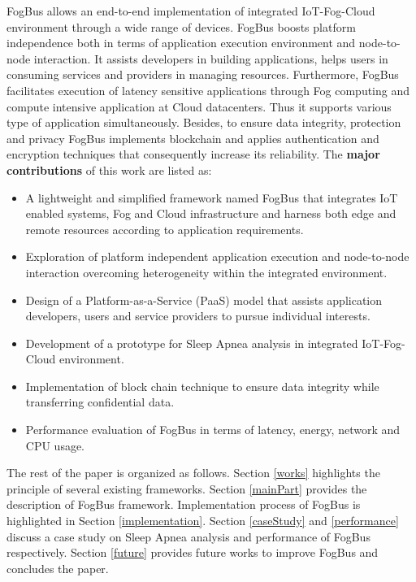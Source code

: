 \documentclass[final,5p,times,twocolumn]{elsarticle}
\begin{document}
\par FogBus allows an end-to-end implementation of integrated IoT-Fog-Cloud environment through a wide range of devices. FogBus boosts platform independence both in terms of application execution environment and node-to-node interaction. It assists developers in building applications, helps users in consuming services and providers in managing resources. Furthermore, FogBus facilitates execution of latency sensitive applications through Fog computing and compute intensive application at Cloud datacenters. Thus it supports various type of application simultaneously. Besides, to ensure data integrity, protection and privacy FogBus implements blockchain and applies authentication and encryption techniques that consequently increase its reliability. The \textbf{major contributions} of this work are listed as:
\begin{itemize}
\item A lightweight and simplified framework named FogBus that integrates IoT enabled systems, Fog and Cloud infrastructure and harness both edge and remote resources according to application requirements.
\item Exploration of platform independent application execution and node-to-node interaction overcoming heterogeneity within the integrated environment.
\item Design of a Platform-as-a-Service (PaaS) model that assists application developers, users and service providers to pursue individual interests. 
\item Development of a prototype for Sleep Apnea analysis in integrated IoT-Fog-Cloud environment.  
\item Implementation of block chain technique to ensure data integrity while transferring confidential data. 
\item Performance evaluation of FogBus in terms of latency, energy, network and CPU usage.            
\end{itemize} 
The rest of the paper is organized as follows. Section \ref{works} highlights the principle of several existing frameworks. Section \ref{mainPart} provides the description of FogBus framework. Implementation process of FogBus is highlighted in Section \ref{implementation}. Section \ref{caseStudy} and \ref{performance} discuss a case study on Sleep Apnea analysis and performance of FogBus respectively. Section \ref{future} provides future works to improve FogBus and concludes the paper.           
%
\end{document}
